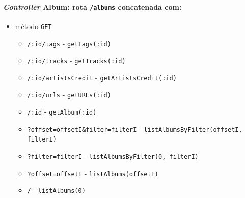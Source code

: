 \documentclass{article}
\begin{document}
\paragraph{\textit{Controller} Album: rota \texttt{/albums} concatenada com:}
    \begin{itemize}
        \item método \texttt{GET}
            \begin{itemize}
                \item \texttt{/:id/tags} - \texttt{getTags(:id)} 
                \item \texttt{/:id/tracks} - \texttt{getTracks(:id)} 
                \item \texttt{/:id/artistsCredit} - \texttt{getArtistsCredit(:id)} 
                \item \texttt{/:id/urls} - \texttt{getURLs(:id)} 
                \item \texttt{/:id} - \texttt{getAlbum(:id)} 
                \item \texttt{?offset=offsetI\&filter=filterI} - \texttt{listAlbumsByFilter(offsetI, filterI)}
                \item \texttt{?filter=filterI} - \texttt{listAlbumsByFilter(0, filterI)}
                \item \texttt{?offset=offsetI} - \texttt{listAlbums(offsetI)}
                \item \texttt{/} - \texttt{listAlbums(0)}
            \end{itemize}
    \end{itemize}
\end{document}
